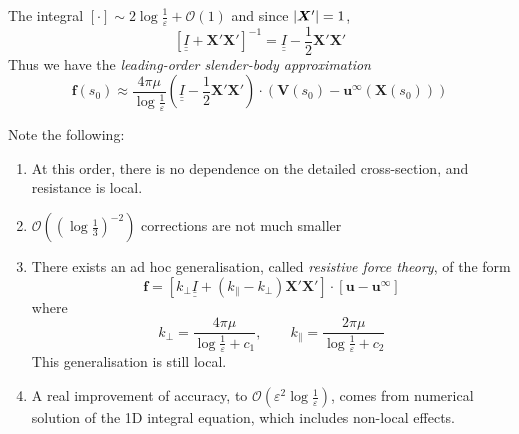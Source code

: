 \documentclass{jknotes}
\newcommand{\dunder}[1]{\underline{\underline{#1}}}
\renewcommand{\u}{\bm{u}}
\newcommand{\X}{\bm{X}}
\begin{document}
The integral $\left[ \cdot \right] \sim 2 \log \frac{1}{\varepsilon} +
\mathcal{O}(1)$ and since $\abs{\X'} = 1$,
\begin{equation}
	\left[\dunder{I} + \X' \X'\right]^{-1} = \dunder{I} - \frac{1}{2}\X'\X'
\end{equation}
Thus we have the \emph{leading-order slender-body approximation}
\begin{equation}
	\bm{f}(s_0) \approx \frac{4\pi \mu}{\log \frac{1}{\varepsilon}} \left(
		\dunder{I} - \frac{1}{2} \X'\X' \right)\cdot\left(\bm{V}(s_0) -
	\u^\infty(\X(s_0))\right)
\end{equation}

Note the following:
\begin{enumerate}
	\item At this order, there is no dependence on the detailed cross-section,
		and resistance is local.
	\item $\mathcal{O}\left((\log \frac{1}{3})^{-2}\right)$ corrections are not
		much smaller
	\item  There exists an ad hoc generalisation, called \emph{resistive force
		theory}, of the form
		\begin{equation}
			\bm{f} = \left[ k_{\perp} \dunder{I} + (k_{\parallel} - k_{\perp})
			\X' \X'\right] \cdot \left[ \u - \u^\infty\right]
		\end{equation}
		where
		\begin{equation}
			k_{\perp} = \frac{4\pi\mu}{\log \frac{1}{\varepsilon} + c_1},
			\hspace{2em} k_{\parallel} = \frac{2\pi \mu}{\log
			\frac{1}{\varepsilon} + c_2}
		\end{equation}
		This generalisation is still local.
	\item A real improvement of accuracy, to $\mathcal{O}(\varepsilon^2 \log
		\frac{1}{\varepsilon})$, comes from numerical solution of the 1D
		integral equation, which includes non-local effects.
\end{enumerate}
\end{document}
